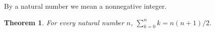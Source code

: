 \documentclass{article}
\newtheorem{theorem}{Theorem}
\begin{document}
By a natural number we mean a nonnegative integer.
\begin{theorem}\label{thm:E04}
For every natural number $n$, $\sum_{k=0}^{n}k=n(n+1)/2$.
\end{theorem}
\end{document}
